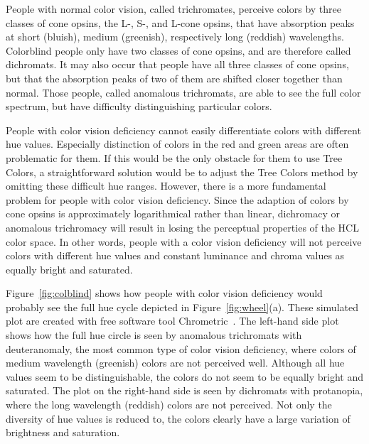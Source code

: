 \documentclass[review,journal]{vgtc}         %
\begin{document}
People with normal color vision, called trichromates, perceive colors by three classes of cone opsins, the L-, S-, and L-cone opsins, that have absorption peaks at short (bluish), medium (greenish),  respectively long (reddish) wavelengths. Colorblind people only have two classes of cone opsins, and are therefore called dichromats. It may also occur that people have all three classes of cone opsins, but that the absorption peaks of two of them are shifted closer together than normal. Those people, called anomalous trichromats, are able to see the full color spectrum, but have difficulty distinguishing particular colors.


People with color vision deficiency cannot easily differentiate colors with different hue values. Especially distinction of colors in the red and green areas are often problematic for them. If this would be the only obstacle for them to use Tree Colors, a straightforward solution would be to adjust the Tree Colors method by omitting these difficult hue ranges. However, there is a more fundamental problem for people with color vision deficiency. Since the adaption of colors by cone opsins is approximately logarithmical rather than linear, dichromacy or anomalous trichromacy will result in losing the perceptual properties of the HCL color space. In other words, people with a color vision deficiency will not perceive colors with different hue values and constant luminance and chroma values as equally bright and saturated. 

Figure~\ref{fig:colblind} shows how people with color vision deficiency would probably see the full hue cycle depicted in Figure~\ref{fig:wheel}(a). These simulated plot are created with free software tool Chrometric~\cite{chrometric}. The left-hand side plot shows how the full hue circle is seen by anomalous trichromats with deuteranomaly, the most common type of color vision deficiency, where colors of medium wavelength (greenish) colors are not perceived well. Although all hue values seem to be distinguishable, the colors do not seem to be equally bright and saturated. The plot on the right-hand side is seen by dichromats with protanopia, where the long wavelength (reddish) colors are not perceived. Not only the diversity of hue values is reduced to, the colors clearly have a large variation of brightness and saturation.
\end{document}
